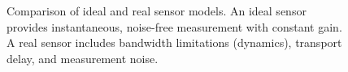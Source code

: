 \begin{figure}[htbp]
\caption{Comparison of ideal and real sensor models. An ideal sensor provides instantaneous, noise-free measurement with constant gain. A real sensor includes bandwidth limitations (dynamics), transport delay, and measurement noise.}
\label{fig:sensor_chain}
\end{figure}

